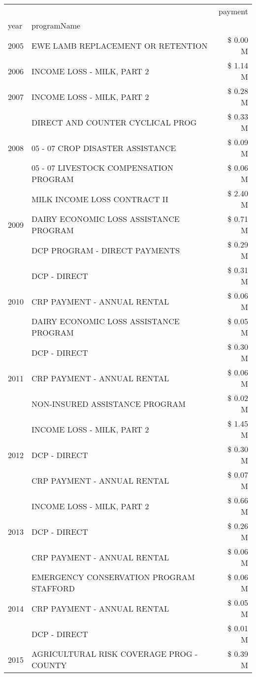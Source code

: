 \begin{tabular}{llr}
\toprule
 &  & payment \\
year & programName &  \\
\midrule
2005 & EWE LAMB REPLACEMENT OR RETENTION & \$ 0.00 M \\
\cline{1-3}
2006 & INCOME LOSS - MILK, PART 2 & \$ 1.14 M \\
\cline{1-3}
2007 & INCOME LOSS - MILK, PART 2 & \$ 0.28 M \\
\cline{1-3}
\multirow[t]{3}{*}{2008} & DIRECT AND COUNTER CYCLICAL PROG & \$ 0.33 M \\
 & 05 - 07 CROP DISASTER ASSISTANCE & \$ 0.09 M \\
 & 05 - 07 LIVESTOCK COMPENSATION PROGRAM & \$ 0.06 M \\
\cline{1-3}
\multirow[t]{3}{*}{2009} & MILK INCOME LOSS CONTRACT II & \$ 2.40 M \\
 & DAIRY ECONOMIC LOSS ASSISTANCE PROGRAM & \$ 0.71 M \\
 & DCP PROGRAM - DIRECT PAYMENTS & \$ 0.29 M \\
\cline{1-3}
\multirow[t]{3}{*}{2010} & DCP - DIRECT & \$ 0.31 M \\
 & CRP PAYMENT - ANNUAL RENTAL & \$ 0.06 M \\
 & DAIRY ECONOMIC LOSS ASSISTANCE PROGRAM & \$ 0.05 M \\
\cline{1-3}
\multirow[t]{3}{*}{2011} & DCP - DIRECT & \$ 0.30 M \\
 & CRP PAYMENT - ANNUAL RENTAL & \$ 0.06 M \\
 & NON-INSURED ASSISTANCE PROGRAM & \$ 0.02 M \\
\cline{1-3}
\multirow[t]{3}{*}{2012} & INCOME LOSS - MILK, PART 2 & \$ 1.45 M \\
 & DCP - DIRECT & \$ 0.30 M \\
 & CRP PAYMENT - ANNUAL RENTAL & \$ 0.07 M \\
\cline{1-3}
\multirow[t]{3}{*}{2013} & INCOME LOSS - MILK, PART 2 & \$ 0.66 M \\
 & DCP - DIRECT & \$ 0.26 M \\
 & CRP PAYMENT - ANNUAL RENTAL & \$ 0.06 M \\
\cline{1-3}
\multirow[t]{3}{*}{2014} & EMERGENCY CONSERVATION PROGRAM STAFFORD & \$ 0.06 M \\
 & CRP PAYMENT - ANNUAL RENTAL & \$ 0.05 M \\
 & DCP - DIRECT & \$ 0.01 M \\
\cline{1-3}
\multirow[t]{3}{*}{2015} & AGRICULTURAL RISK COVERAGE PROG - COUNTY & \$ 0.39 M \\

\end{tabular}
